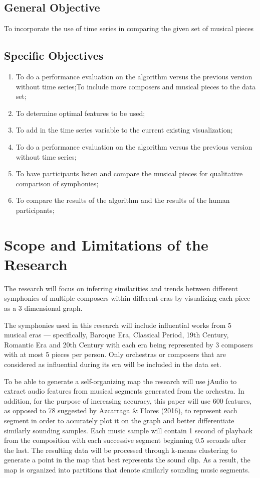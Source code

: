 \subsection{General Objective}
\label{sec:generalobjective}
To incorporate the use of time series in comparing the given set of musical pieces
\subsection{Specific Objectives}
\label{sec:specificobjectives}
\begin{enumerate}
\item To do a performance evaluation on the algorithm versus the previous version without time series;To include more composers and musical pieces to the data set;
\item To determine optimal features to be used;
\item To add in the time series variable to the current existing visualization;
\item To do a performance evaluation on the algorithm versus the previous version without time series;
\item To have participants listen and compare the musical pieces for qualitative comparison of symphonies;
\item To compare the results of the algorithm and the results of the human participants;
\end{enumerate}
\section{Scope and Limitations of the Research}
\label{sec:scopelimitations}
The research will focus on inferring similarities and trends between different symphonies of multiple composers within different eras by visualizing each piece as a 3 dimensional graph. 

The symphonies used in this research will include influential works from 5 musical eras — specifically, Baroque Era, Classical Period, 19th Century, Romantic Era and 20th Century with each era being represented by 3 composers with at most 5 pieces per person. Only orchestras or composers that are considered as influential during its era will be included in the data set.

To be able to generate a self-organizing map the research will use jAudio to extract audio features from musical segments generated from the orchestra. In addition, for the purpose of increasing accuracy, this paper will use 600 features, as opposed to 78 suggested by Azcarraga \& Flores (2016), to represent each segment in order to accurately plot it on the graph and better differentiate similarly sounding samples. Each music sample will contain 1 second of playback from the composition with each successive segment beginning 0.5 seconds after the last. The resulting data will be processed through k-means clustering to generate a point in the map that best represents the sound clip. As a result, the map is organized into partitions that  denote similarly sounding music segments. 

